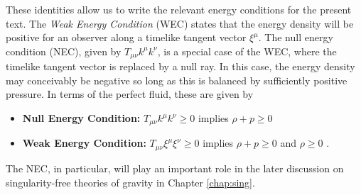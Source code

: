 These identities allow us to write the relevant energy conditions for the present text. The \emph{Weak Energy Condition} (WEC) states that the energy density will be positive for an observer along a timelike tangent vector $\xi^\mu$. The null energy condition (NEC), given by $T_{\mu\nu}k^\mu k^\nu$, is a special case of the WEC, where the timelike tangent vector is replaced by a null ray. In this case, the energy density may conceivably be negative so long as this is balanced by sufficiently positive pressure. In terms of the perfect fluid, these are given by 
\begin{itemize}
\item {\bf Null Energy Condition:}
 $T_{\mu\nu}k^\mu k^\nu\geq 0$ implies $\rho+p\geq0$ \label{NEC}
\item {\bf Weak Energy Condition:} $T_{\mu\nu}\xi^\mu \xi^\nu\geq 0$ implies $\rho+p\geq0$ and $\rho\geq0$ \cite{Carroll:2004st}.
\end{itemize}
The NEC, in particular, will play an important role in the later discussion on singularity-free theories of gravity in Chapter \ref{chap:sing}. 

